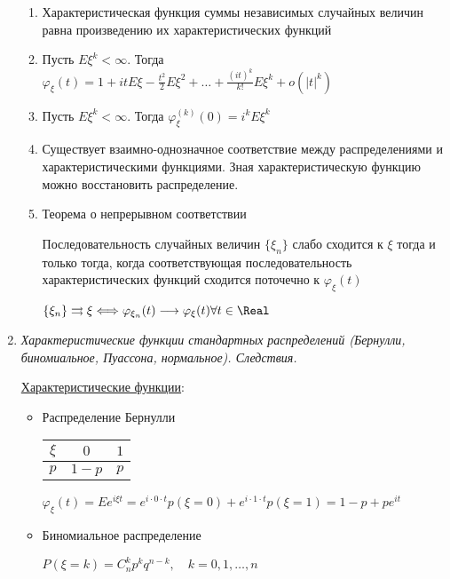 \begin{enumerate}
\begin{enumerate}
        \item Характеристическая функция суммы независимых случайных величин равна произведению их характеристических функций

        \item Пусть $E\xi^k < \infty$. Тогда $\varphi_\xi(t) = 1 + it E\xi - \frac{t^2}{2}E\xi^2 + \dots + \frac{(it)^k}{k!} E\xi^k + o(|t|^k)$

        \item Пусть $E\xi^k < \infty$. Тогда $\varphi_\xi^{(k)}(0) = i^k E\xi^k$

        \item Существует взаимно-однозначное соответствие между распределениями и характеристическими функциями.
        Зная характеристическую функцию можно восстановить распределение.

        \item Теорема о непрерывном соответствии
        
        \Ths Последовательность случайных величин $\{\xi_n\}$ слабо сходится к $\xi$ тогда и только тогда, когда
            соответствующая последовательность характеристических функций сходится поточечно к $\varphi_\xi(t)$

        $\{\xi_n\} \rightrightarrows \xi \Longleftrightarrow \varphi_{\xi_n}(t) \longrightarrow \varphi_\xi(t) \forall t \in \Real$
    \end{enumerate}

    \item \textit{Характеристические функции стандартных распределений (Бернулли, биномиальное, Пуассона, нормальное). Следствия.}

    \hyperlink{characteristicfunctionofstandarddistributions}{Характеристические функции}: 

    \begin{itemize}
        \item Распределение Бернулли

        \begin{tabular}{c|c|c}
            $\xi$ & $0$     & $1$    \\
            \hline
            $p$   & $1 - p$ & $p$
        \end{tabular} \qquad\qquad $\varphi_\xi(t) = Ee^{i\xi t} = e^{i \cdot 0 \cdot t} p(\xi = 0) + e^{i \cdot 1 \cdot t} p(\xi = 1) = 1 - p + p e^{it}$

        \item Биномиальное распределение

        $P(\xi = k) = C_n^k p^k q^{n - k}, \quad k = 0, 1, \dots, n$


\end{itemize}
\end{enumerate}
